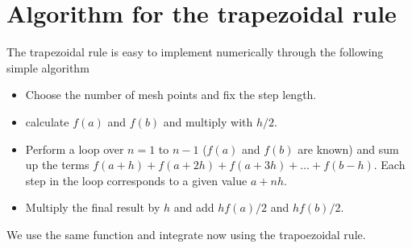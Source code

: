 \documentclass[letterpaper,10pt,english]{sphinxmanual}
\begin{document}
\section{Algorithm for the trapezoidal rule}
\label{\detokenize{chapter1:algorithm-for-the-trapezoidal-rule}}
The trapezoidal rule is easy to  implement numerically
through the following simple algorithm
\begin{itemize}
\item {} 
Choose the number of mesh points and fix the step length.

\item {} 
calculate \(f(a)\) and \(f(b)\) and multiply with \(h/2\).

\item {} 
Perform a loop over \(n=1\) to \(n-1\) (\(f(a)\) and \(f(b)\) are known) and sum up  the terms \(f(a+h) +f(a+2h)+f(a+3h)+\dots +f(b-h)\). Each step in the loop  corresponds to a given value \(a+nh\).

\item {} 
Multiply the final result by \(h\) and add \(hf(a)/2\) and \(hf(b)/2\).

\end{itemize}

We use the same function and integrate now using the trapoezoidal rule.
\end{document}
